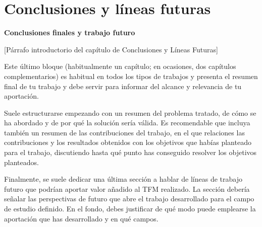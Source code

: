 \chapter{Conclusiones y líneas futuras}\label{chap:conclusiones}
\textbf{Conclusiones finales y trabajo futuro}

[Párrafo introductorio del capítulo de Conclusiones y Líneas Futuras]

Este último bloque (habitualmente un capítulo; en ocasiones, dos capítulos complementarios) es habitual en todos los tipos de trabajos y presenta el resumen final de tu trabajo y debe servir para informar del alcance y relevancia de tu aportación.\par

Suele estructurarse empezando con un resumen del problema tratado, de cómo se ha abordado y de por qué la solución sería válida.
Es recomendable que incluya también un resumen de las contribuciones del trabajo, en el que relaciones las contribuciones y los resultados obtenidos con los objetivos que habías planteado para el trabajo, discutiendo hasta qué punto has conseguido resolver los objetivos planteados.\par

Finalmente, se suele dedicar una última sección a hablar de líneas de trabajo futuro que podrían aportar valor añadido al TFM realizado. La sección debería señalar las perspectivas de futuro que abre el trabajo desarrollado para el campo de estudio definido. En el fondo, debes justificar de qué modo puede emplearse la aportación que has desarrollado y en qué campos.
